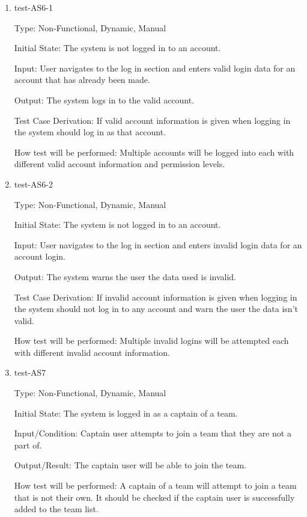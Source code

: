 \documentclass[12pt, titlepage]{article}
\begin{document}
\begin{enumerate}
  \item{test-AS6-1\\}
  
  Type: Non-Functional, Dynamic, Manual

  Initial State: The system is not logged in to an account.

  Input: User navigates to the log in section and enters valid login data for
  an account that has already been made.

  Output: The system logs in to the valid account.

  Test Case Derivation: If valid account information is given when logging in
  the system should log in as that account.

  How test will be performed: Multiple accounts will be logged into each with
  different valid account information and permission levels.

  \item{test-AS6-2\\}

  Type: Non-Functional, Dynamic, Manual

  Initial State: The system is not logged in to an account.

  Input: User navigates to the log in section and enters invalid login data
  for an account login.

  Output: The system warns the user the data used is invalid.

  Test Case Derivation: If invalid account information is given when logging
  in the system should not log in to any account and warn the user the data
  isn't valid.

  How test will be performed: Multiple invalid logins will be attempted each
  with different invalid account information.

  \item{test-AS7\\}
  
  Type: Non-Functional, Dynamic, Manual
            
  Initial State: The system is logged in as a captain of a team. 
            
  Input/Condition: Captain user attempts to join a team that they are not a part
  of.
            
  Output/Result: The captain user will be able to join the team.
            
  How test will be performed: A captain of a team will attempt to join a
  team that is not their own. It should be checked if the captain user is
  successfully added to the team list.


\end{enumerate}
\end{document}
